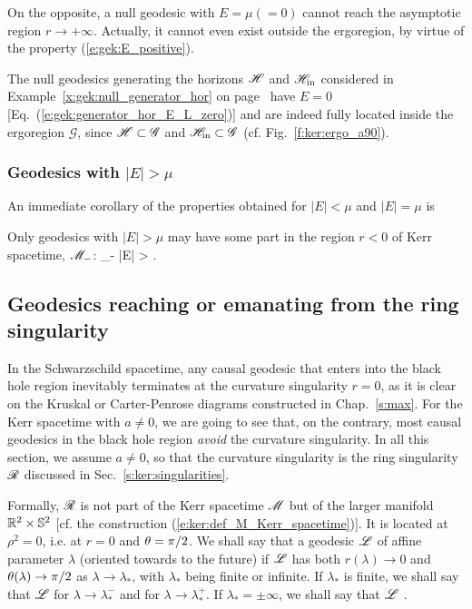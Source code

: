 On the opposite, a null geodesic with $E=\mu (=0)$
cannot reach the asymptotic region
$r\to +\infty$. Actually, it cannot even exist outside the ergoregion,
by virtue of the property (\ref{e:gek:E_positive}).
\begin{example}
The null geodesics generating the horizons $\mathscr{H}$ and $\mathscr{H}_{\rm in}$
considered in
Example~\ref{x:gek:null_generator_hor} on page~\pageref{x:gek:null_generator_hor}
have $E=0$ [Eq.~(\ref{e:gek:generator_hor_E_L_zero})]
and are indeed fully located inside the ergoregion $\mathscr{G}$,
since $\mathscr{H}\subset\mathscr{G}$ and $\mathscr{H}_{\rm in}\subset\mathscr{G}$
(cf. Fig.~\ref{f:ker:ergo_a90}).
\end{example}

\subsubsection{Geodesics with $|E|>\mu$}

An immediate corollary of the properties obtained for $|E|<\mu$ and $|E|=\mu$
is
\begin{greybox}
Only geodesics with $|E| > \mu$ may have some part in the region $r<0$ of Kerr spacetime, $\mathscr{M}_-$:
\be \label{e:ker:neg_r_large_E}
    \Li \cap \M_- \neq \varnothing \Longrightarrow |E| > \mu .
\ee
\end{greybox}

\subsection{Geodesics reaching or emanating from the ring singularity}

In the Schwarzschild spacetime, any causal geodesic that enters into the black
hole region inevitably terminates at the curvature singularity $r=0$, as it
is clear on the Kruskal or Carter-Penrose diagrams constructed in Chap.~\ref{s:max}.
For the Kerr spacetime with $a\neq 0$, we are going to see that, on the contrary,
most causal geodesics in the black hole region \emph{avoid} the curvature
singularity. In all this section, we assume $a\neq 0$, so that the
curvature singularity is the ring singularity $\mathscr{R}$
discussed in Sec.~\ref{s:ker:singularities}.

Formally, $\mathscr{R}$ is not
part of the Kerr spacetime $\mathscr{M}$ but of the larger manifold $\mathbb{R}^2\times\mathbb{S}^2$
[cf. the construction (\ref{e:ker:def_M_Kerr_spacetime})]. It is located
at $\rho^2 = 0$, i.e. at $r=0$ and
$\theta=\pi/2$. We shall say that a
geodesic $\mathscr{L}$ of affine parameter $\lambda$ (oriented towards to the future)
if $\mathscr{L}$ has both
$r(\lambda)\to 0$ and $\theta(\lambda) \to \pi/2$ as $\lambda\to\lambda_*$, with
$\lambda_*$ being finite or infinite. If $\lambda_*$ is finite, we shall say
that $\mathscr{L}$ 
for $\lambda\to\lambda_*^-$ and
for $\lambda\to\lambda_*^+$. If $\lambda_*=\pm\infty$, we shall say
that $\mathscr{L}$ .

